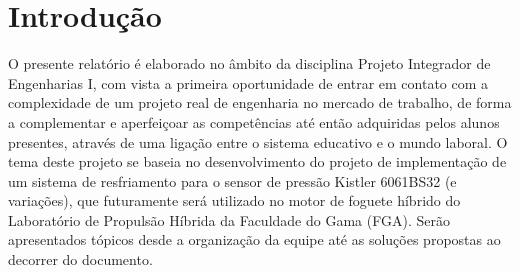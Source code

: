 \chapter{Introdução}

O presente relatório é elaborado no âmbito da disciplina Projeto Integrador de Engenharias I, com vista a primeira oportunidade de entrar em contato com a complexidade de um projeto real de engenharia no mercado de trabalho, de forma a complementar e aperfeiçoar as competências até então adquiridas pelos alunos presentes, através de uma ligação entre o sistema educativo e o mundo laboral.
O tema deste projeto se baseia no desenvolvimento do projeto de implementação de um sistema de resfriamento para o sensor de pressão Kistler 6061BS32 (e variações), que futuramente será utilizado no motor de foguete híbrido do Laboratório de Propulsão Híbrida da Faculdade do Gama (FGA). 
Serão apresentados tópicos desde a organização da equipe até as soluções propostas ao decorrer do documento.
